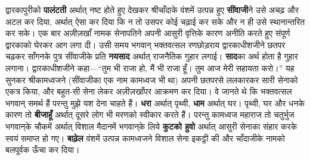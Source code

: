 \begin{sloppypar}\justifying{}
द्वारकापुरीको \textbf{पालंटती} अर्थात् नष्ट होते हुए देखकर श्रीचाँदाके वंशमें उत्पन्न हुए \textbf{सींवाजी}ने उसे अचढ़ और अटल कर दिया, अर्थात् ऐसा कर दिया कि न तो उसपर कोई चढ़ाई कर सके और न ही उसे स्थानान्तरित कर सके। एक बार अज़ीज़खाँ नामक सेनापतिने अपनी आसुरी वृत्तिके कारण अनीति करते हुए संपूर्ण द्वारकाको घेरकर आग लगा दी। उसी समय भगवान् भक्तवत्सल रणछोड़राय द्वारकाधीशजीने छतपर चढ़कर साँगनके पुत्र सींवाजीके प्रति \textbf{नयसाद} अर्थात् राजनैतिक गुहार लगाई। \textbf{साद}का अर्थ होता है गुहार लगाना। द्वारकाधीशजीने कहा—“तुम भी राजा हो, मैं भी राजा हूँ। तुम आज मेरी सहायता करो।” यह सुनकर श्रीकामध्वजने (सींवाजीका एक नाम कामध्वज भी था) अपनी छतपरसे ललकारकर सारी सेनाको एकत्र किया, और बहुत-सी सेना लेकर अज़ीज़खाँपर आक्रमण कर दिया। वे जानते थे कि भक्तवत्सल भगवान् समर्थ हैं परन्तु मुझे यश देना चाहते हैं। \textbf{धरा} अर्थात् पृथ्वी, \textbf{धाम} अर्थात् घर। पृथ्वी, घर और धनके कारण तो \textbf{बीजाहूँ} अर्थात् दूसरे लोग भी मरणको स्वीकार करते हैं। परन्तु कामध्वज महाराज तो चतुर्भुज भगवान्‌के चौकमें अर्थात् विशाल मैदानमें भगवान्‌के लिये \textbf{कुटको हुवो} अर्थात् आसुरी सेनाका संहार करके स्वयं समाप्त हो गए। \textbf{बाढ़ेल} वंशमें उत्पन्न कामध्वजने विशाल सेना इकट्ठी की और चाँदाजीके नामको बलपूर्वक ऊँचा कर दिया।
\end{sloppypar}


